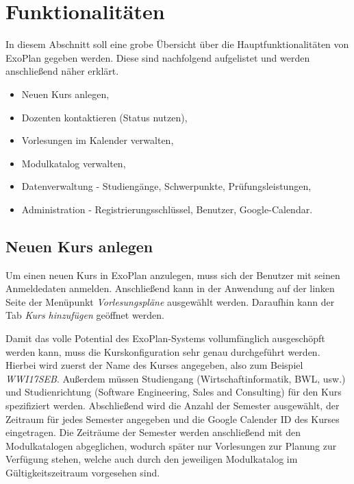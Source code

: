\section{Funktionalitäten}

In diesem Abschnitt soll eine grobe Übersicht über die Hauptfunktionalitäten von ExoPlan gegeben werden. Diese sind nachfolgend aufgelistet und werden anschließend näher erklärt.

\begin{itemize}
	\item Neuen Kurs anlegen,
	\item Dozenten kontaktieren (Status nutzen),
	\item Vorlesungen im Kalender verwalten,
	\item Modulkatalog verwalten,
	\item Datenverwaltung - Studiengänge, Schwerpunkte, Prüfungsleistungen,
	\item Administration - Registrierungsschlüssel, Benutzer, Google-Calendar.
\end{itemize}

\subsection{Neuen Kurs anlegen}

Um einen neuen Kurs in ExoPlan anzulegen, muss sich der Benutzer mit seinen Anmeldedaten anmelden. Anschließend kann in der Anwendung auf der linken Seite der Menüpunkt \textit{Vorlesungspläne} ausgewählt werden. Daraufhin kann der Tab \textit{Kurs hinzufügen} geöffnet werden.

Damit das volle Potential des ExoPlan-Systems vollumfänglich ausgeschöpft werden kann, muss die Kurskonfiguration sehr genau durchgeführt werden. Hierbei wird zuerst der Name des Kurses angegeben, also zum Beispiel \textit{WWI17SEB}. Außerdem müssen Studiengang (Wirtschaftinformatik, BWL, usw.) und Studienrichtung (Software Engineering, Sales and Consulting) für den Kurs spezifiziert werden. Abschließend wird die Anzahl der Semester ausgewählt, der Zeitraum für jedes Semester angegeben und die Google Calender ID des Kurses eingetragen. Die Zeiträume der Semester werden anschließend mit den Modulkatalogen abgeglichen, wodurch später nur Vorlesungen zur Planung zur Verfügung stehen, welche auch durch den jeweiligen Modulkatalog im Gültigkeitszeitraum vorgesehen sind.

